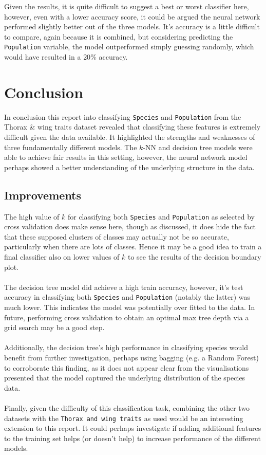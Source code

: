 \documentclass{article}
\begin{document}
Given the results, it is quite difficult to suggest a best or worst classifier here, however, even with a lower accuracy score, it could be argued the neural network performed slightly better out of the three models. It's accuracy is a little difficult to compare, again because it is combined, but considering predicting the \texttt{Population} variable, the model outperformed simply guessing randomly, which would have resulted in a $20\%$ accuracy.


\newpage
\section{Conclusion}


In conclusion this report into classifying \texttt{Species} and \texttt{Population} from the Thorax \& wing traits dataset revealed that classifying these features is extremely difficult given the data available. It highlighted the strengths and weaknesses of three fundamentally different models. The $k$-NN and decision tree models were able to achieve fair results in this setting, however, the neural network model perhaps showed a better understanding of the underlying structure in the data.

\subsection{Improvements}

The high value of $k$ for classifying both \texttt{Species} and \texttt{Population} as selected by cross validation does make sense here, though as discussed, it does hide the fact that these supposed clusters of classes may actually not be so accurate, particularly when there are lots of classes. Hence it may be a good idea to train a final classifier also on lower values of $k$ to see the results of the decision boundary plot. \\
\\
The decision tree model did achieve a high train accuracy, however, it's test accuracy in classifying both \texttt{Species} and \texttt{Population} (notably the latter) was much lower. This indicates the model was potentially over fitted to the data. In future, performing cross validation to obtain an optimal max tree depth via a grid search may be a good step. \\
\\
Additionally, the decision tree's high performance in classifying species would benefit from further investigation, perhaps using bagging (e.g. a Random Forest) to corroborate this finding, as it does not appear clear from the visualisations presented that the model captured the underlying distribution of the species data. \\
\\
Finally, given the difficulty of this classification task, combining the other two datasets with the \texttt{Thorax and wing traits} as used would be an interesting extension to this report. It could perhaps investigate if adding additional features to the training set helps (or doesn't help) to increase performance of the different models.
\end{document}
